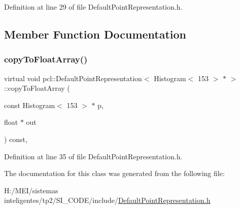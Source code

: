 Definition at line 29 of file Default\+Point\+Representation.\+h.



\subsection{Member Function Documentation}
\mbox{\label{classpcl_1_1_default_point_representation_3_01_histogram_3_01153_01_4_01_5_01_4_af9596e041f0502152f0e2673f9f2358d}} 
\subsubsection{\texorpdfstring{copy\+To\+Float\+Array()}{copyToFloatArray()}}
{\footnotesize\ttfamily virtual void pcl\+::\+Default\+Point\+Representation$<$ Histogram$<$ 153 $>$ $\ast$ $>$\+::copy\+To\+Float\+Array (\begin{DoxyParamCaption}\item[{const Histogram$<$ 153 $>$ $\ast$}]{p,  }\item[{float $\ast$}]{out }\end{DoxyParamCaption}) const\hspace{0.3cm}{\ttfamily [inline]}, {\ttfamily [virtual]}}



Definition at line 35 of file Default\+Point\+Representation.\+h.



The documentation for this class was generated from the following file\+:\begin{DoxyCompactItemize}
\item 
H\+:/\+M\+E\+I/sistemas inteligentes/tp2/\+S\+I\+\_\+\+C\+O\+D\+E/include/\hyperlink{_default_point_representation_8h}{Default\+Point\+Representation.\+h}\end{DoxyCompactItemize}
